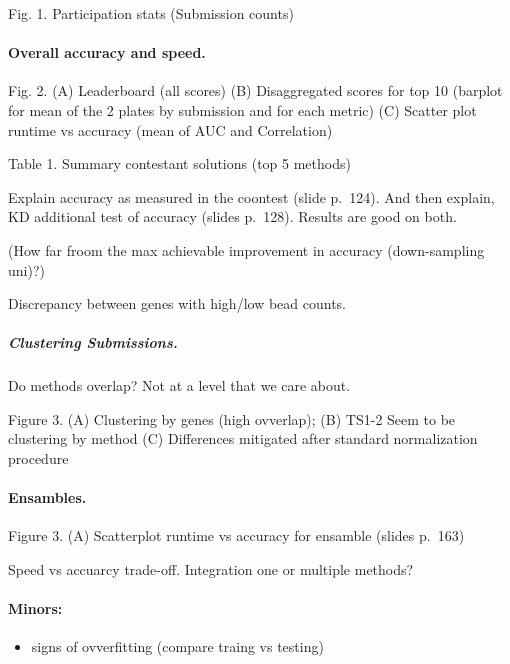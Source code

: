 \documentclass[]{article}
\providecommand{\tightlist}{%
  \setlength{\itemsep}{0pt}\setlength{\parskip}{0pt}}
\let\oldparagraph\paragraph
\renewcommand{\paragraph}[1]{\oldparagraph{#1}\mbox{}}
\let\oldsubparagraph\subparagraph
\renewcommand{\subparagraph}[1]{\oldsubparagraph{#1}\mbox{}}
\begin{document}
Fig. 1. Participation stats (Submission counts)

\hypertarget{overall-accuracy-and-speed.}{%
\paragraph{Overall accuracy and
speed.}\label{overall-accuracy-and-speed.}}

Fig. 2. (A) Leaderboard (all scores) (B) Disaggregated scores for top 10
(barplot for mean of the 2 plates by submission and for each metric) (C)
Scatter plot runtime vs accuracy (mean of AUC and Correlation)

Table 1. Summary contestant solutions (top 5 methods)

Explain accuracy as measured in the coontest (slide p.~124). And then
explain, KD additional test of accuracy (slides p.~128). Results are
good on both.

(How far froom the max achievable improvement in accuracy (down-sampling
uni)?)

Discrepancy between genes with high/low bead counts.

\hypertarget{clustering-submissions.}{%
\subparagraph{Clustering Submissions.}\label{clustering-submissions.}}

Do methods overlap? Not at a level that we care about.

Figure 3. (A) Clustering by genes (high ovverlap); (B) TS1-2 Seem to be
clustering by method (C) Differences mitigated after standard
normalization procedure

\hypertarget{ensambles.}{%
\paragraph{Ensambles.}\label{ensambles.}}

Figure 3. (A) Scatterplot runtime vs accuracy for ensamble (slides
p.~163)

Speed vs accuarcy trade-off. Integration one or multiple methods?

\hypertarget{minors}{%
\paragraph{Minors:}\label{minors}}

\begin{itemize}
\tightlist
\item
  signs of ovverfitting (compare traing vs testing)
\end{itemize}
\end{document}
